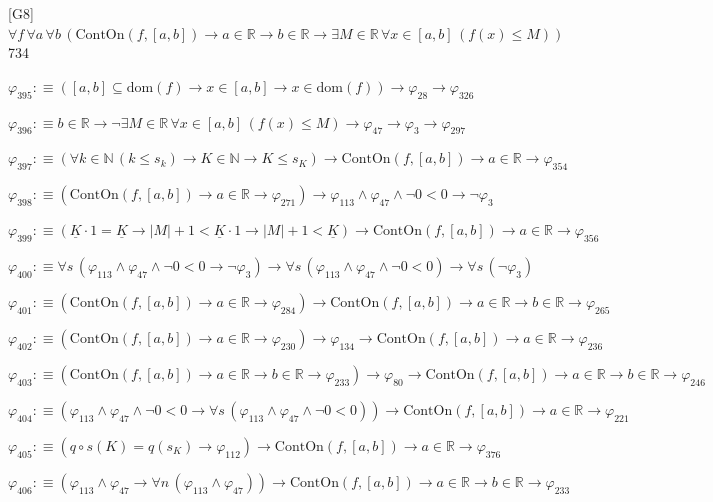\begin{fullproof}{[G8]}{$\forall f\,\forall a\,\forall b\,(\mathrm{ContOn}(f,[a,b]) \to a \in \mathbb{R} \to b \in \mathbb{R} \to \exists M \in \mathbb{R}\,\forall x \in [a,b]\,(f(x) \leq M))$}{734}
\begin{abbrevlist}
\item $\varphi_{395} :\equiv ([a,b] \subseteq \mathrm{dom}(f) \to x \in [a,b] \to x \in \mathrm{dom}(f)) \to \varphi_{28} \to \varphi_{326}$
\item $\varphi_{396} :\equiv b \in \mathbb{R} \to \neg \exists M \in \mathbb{R}\,\forall x \in [a,b]\,(f(x) \leq M) \to \varphi_{47} \to \varphi_{3} \to \varphi_{297}$
\item $\varphi_{397} :\equiv (\forall k \in \mathbb{N}\,(k \leq s_{k}) \to K \in \mathbb{N} \to K \leq s_{K}) \to \mathrm{ContOn}(f,[a,b]) \to a \in \mathbb{R} \to \varphi_{354}$
\item $\varphi_{398} :\equiv (\mathrm{ContOn}(f,[a,b]) \to a \in \mathbb{R} \to \varphi_{271}) \to \varphi_{113} \land \varphi_{47} \land \neg 0 < 0 \to \neg \varphi_{3}$
\item $\varphi_{399} :\equiv (\underline{K} \cdot 1 = \underline{K} \to \lvert M \rvert + 1 < \underline{K} \cdot 1 \to \lvert M \rvert + 1 < \underline{K}) \to \mathrm{ContOn}(f,[a,b]) \to a \in \mathbb{R} \to \varphi_{356}$
\item $\varphi_{400} :\equiv \forall s\,(\varphi_{113} \land \varphi_{47} \land \neg 0 < 0 \to \neg \varphi_{3}) \to \forall s\,(\varphi_{113} \land \varphi_{47} \land \neg 0 < 0) \to \forall s\,(\neg \varphi_{3})$
\item $\varphi_{401} :\equiv (\mathrm{ContOn}(f,[a,b]) \to a \in \mathbb{R} \to \varphi_{284}) \to \mathrm{ContOn}(f,[a,b]) \to a \in \mathbb{R} \to b \in \mathbb{R} \to \varphi_{265}$
\item $\varphi_{402} :\equiv (\mathrm{ContOn}(f,[a,b]) \to a \in \mathbb{R} \to \varphi_{230}) \to \varphi_{134} \to \mathrm{ContOn}(f,[a,b]) \to a \in \mathbb{R} \to \varphi_{236}$
\item $\varphi_{403} :\equiv (\mathrm{ContOn}(f,[a,b]) \to a \in \mathbb{R} \to b \in \mathbb{R} \to \varphi_{233}) \to \varphi_{80} \to \mathrm{ContOn}(f,[a,b]) \to a \in \mathbb{R} \to b \in \mathbb{R} \to \varphi_{246}$
\item $\varphi_{404} :\equiv (\varphi_{113} \land \varphi_{47} \land \neg 0 < 0 \to \forall s\,(\varphi_{113} \land \varphi_{47} \land \neg 0 < 0)) \to \mathrm{ContOn}(f,[a,b]) \to a \in \mathbb{R} \to \varphi_{221}$
\item $\varphi_{405} :\equiv (q \circ s(K) = q(s_{K}) \to \varphi_{112}) \to \mathrm{ContOn}(f,[a,b]) \to a \in \mathbb{R} \to \varphi_{376}$
\item $\varphi_{406} :\equiv (\varphi_{113} \land \varphi_{47} \to \forall n\,(\varphi_{113} \land \varphi_{47})) \to \mathrm{ContOn}(f,[a,b]) \to a \in \mathbb{R} \to b \in \mathbb{R} \to \varphi_{233}$

\end{abbrevlist}
\end{fullproof}
